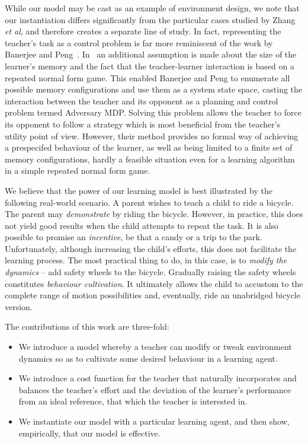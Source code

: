 While our model may be cast as an example of environment design, we
note that our instantiation differs significantly from the particular
cases studied by Zhang \emph{et al}, and therefore creates a separate
line of study. In fact, representing the teacher's task as a control
problem is far more reminiscent of the work by Banerjee and
Peng~\cite{banerjee_peng_2005}. In~\cite{banerjee_peng_2005} an
additional assumption is made about the size of the learner's memory
and the fact that the teacher-learner interaction is based on a
repeated normal form game. This enabled Banerjee and Peng to enumerate
all possible memory configurations and use them as a system state
space, casting the interaction between the teacher and its opponent as
a planning and control problem termed Adversary MDP. Solving this
problem allows the teacher to force its opponent to follow a strategy
which is most beneficial from the teacher's utility point of
view. However, their method provides no formal way of achieving a
prespecifed behaviour of the learner, as well as being limited to a
finite set of memory configurations, hardly a feasible situation even
for a learning algorithm in a simple repeated normal form game.

We believe that the power of our learning model is best illustrated by
the following real-world scenario. A parent wishes to teach a child to
ride a bicycle. The parent may {\em demonstrate} by riding the
bicycle. However, in practice, this does not yield good results when
the child attempts to repeat the task. It is also possible to promise
an {\em incentive}, be that a candy or a trip to the
park. Unfortunately, although increasing the child's efforts, this
does not facilitate the learning process. The most practical thing to
do, in this case, is to {\em modify the dynamics} -- add safety wheels
to the bicycle. Gradually raising the safety wheels constitutes {\em
  behaviour cultivation}. It ultimately allows the child to accustom
to the complete range of motion possibilities and, eventually, ride an
unabridged bicycle version.

The contributions of this work are three-fold:
\begin{itemize}
\item We introduce a model whereby a teacher can modify or tweak environment dynamics so as to cultivate some desired behaviour in a learning agent.
\item We introduce a  cost function for the teacher that
naturally incorporates and balances the teacher's
effort and the deviation of the learner's performance from an ideal
reference, that which the teacher is interested in.
\item We instantiate our model with a particular learning agent, and then show, empirically, that our model  is effective.
\end{itemize}

